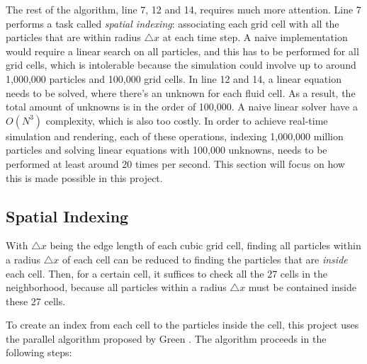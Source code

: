 The rest of the algorithm, line 7, 12 and 14, requires much more attention. Line 7 performs a task called \textit{spatial indexing}: associating each grid cell with all the particles that are within radius $\triangle x$ at each time step. A naive implementation would require a linear search on all particles, and this has to be performed for all grid cells, which is intolerable because the simulation could involve up to around 1,000,000 particles and 100,000 grid cells. In line 12 and 14, a linear equation needs to be solved, where there's an unknown for each fluid cell. As a result, the total amount of unknowns is in the order of 100,000. A naive linear solver have a $O(N^3)$ complexity, which is also too costly. In order to achieve real-time simulation and rendering, each of these operations, indexing 1,000,000 million particles and solving linear equations with 100,000 unknowns, needs to be performed at least around 20 times per second. This section will focus on how this is made possible in this project.

\subsection{Spatial Indexing}
\label{subsection spatial indexing}
With $\triangle x$ being the edge length of each cubic grid cell, finding all particles within a radius $\triangle x$ of each cell can be reduced to finding the particles that are \textit{inside} each cell. Then, for a certain cell, it suffices to check all the 27 cells in the neighborhood, because all particles within a radius $\triangle x$ must be contained inside these 27 cells. 


To create an index from each cell to the particles inside the cell, this project uses the parallel algorithm proposed by Green \cite{harlow1965numerical}. The algorithm proceeds in the following steps:


